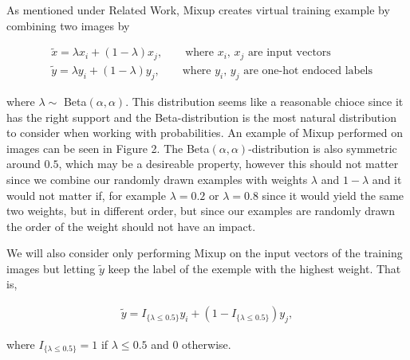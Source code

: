 \documentclass{article}
\begin{document}
As mentioned under Related Work, Mixup creates virtual training example by combining two images by 

\begin{align*}
&\tilde{x} = \lambda x_i + (1-\lambda) x_j, \qquad \text{where $x_i$, $x_j$ are input vectors} \\
&\tilde{y} = \lambda y_i + (1-\lambda) y_j, \qquad \text{where $y_i$, $y_j$ are one-hot endoced labels}
\end{align*}

where $\lambda \sim$ Beta$(\alpha, \alpha)$.
 This distribution seems like a 
reasonable chioce since it has the right support and the Beta-distribution is the most natural distribution to
consider when working with probabilities. 
An example of Mixup performed on images can be seen in Figure 2.
The Beta$(\alpha, \alpha)$-distribution is also symmetric around $0.5$, which may be 
a desireable property, however this should not matter since we combine our randomly drawn examples with weights $\lambda$ and $1-\lambda$ and 
it would not matter if, for example $\lambda = 0.2$ or $\lambda = 0.8$ since it would yield the same two weights, but in different order, but 
since our examples are randomly drawn the order of the weight should not have an impact. 

% 

We will also consider only performing Mixup on the input vectors of the training images but letting $\tilde{y}$ keep the label of the exemple 
with the highest weight. That is,

\begin{align*}
\tilde{y} = I_{\{ \lambda \leq 0.5 \}} y_i + (1-I_{\{ \lambda \leq 0.5 \}}) y_j, 
\end{align*}

where $I_{\{ \lambda \leq 0.5 \}} = 1$ if $\lambda \leq 0.5$ and $0$ otherwise.
\end{document}
